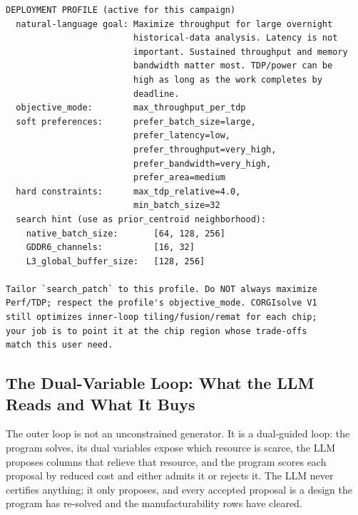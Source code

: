 \begin{tcolorbox}[
    colback=green!6,
    colframe=green!45!black,
    title=\textbf{Deployment Profile: \texttt{overnight\_finance\_batch}},
    fonttitle=\bfseries,
    breakable,
    left=4pt, right=4pt, top=4pt, bottom=4pt
]
\begin{verbatim}
DEPLOYMENT PROFILE (active for this campaign)
  natural-language goal: Maximize throughput for large overnight
                         historical-data analysis. Latency is not
                         important. Sustained throughput and memory
                         bandwidth matter most. TDP/power can be
                         high as long as the work completes by
                         deadline.
  objective_mode:        max_throughput_per_tdp
  soft preferences:      prefer_batch_size=large,
                         prefer_latency=low,
                         prefer_throughput=very_high,
                         prefer_bandwidth=very_high,
                         prefer_area=medium
  hard constraints:      max_tdp_relative=4.0,
                         min_batch_size=32
  search hint (use as prior_centroid neighborhood):
    native_batch_size:       [64, 128, 256]
    GDDR6_channels:          [16, 32]
    L3_global_buffer_size:   [128, 256]

Tailor `search_patch` to this profile. Do NOT always maximize
Perf/TDP; respect the profile's objective_mode. CORGIsolve V1
still optimizes inner-loop tiling/fusion/remat for each chip;
your job is to point it at the chip region whose trade-offs
match this user need.
\end{verbatim}
\end{tcolorbox}

\subsection{The Dual-Variable Loop: What the LLM Reads and What It Buys}
\label{app:llm_duals}

The outer loop is not an unconstrained generator. It is a dual-guided loop: the
program solves, its dual variables expose which resource is scarce, the LLM
proposes columns that relieve that resource, and the program scores each proposal
by reduced cost and either admits it or rejects it. The LLM never certifies
anything; it only proposes, and every accepted proposal is a design the program
has re-solved and the manufacturability rows have cleared.

